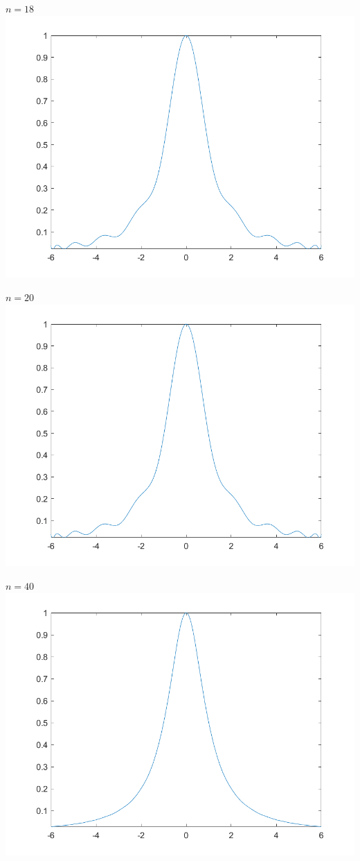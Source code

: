 \begin{center}
	\(n=18\) \\
	\includegraphics[scale=0.55]{cap4/4_7/20.png}
\end{center}

\begin{center}
	\(n=20\) \\
	\includegraphics[scale=0.55]{cap4/4_7/20.png}
\end{center}

\begin{center}
	\(n=40\) \\
	\includegraphics[scale=0.55]{cap4/4_7/40.png}
\end{center}
